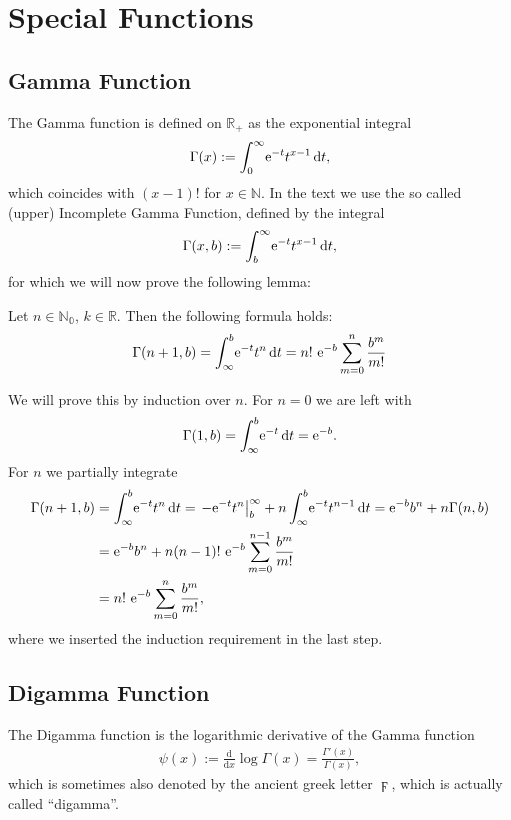 \section{Special Functions}
\subsection{Gamma Function}
The Gamma function is defined on $\mathbb{R}_{+}$ as the exponential integral
\begin{align}
    \Gamma(x) := \Integ[\infty]{0}{t}{\Eto{-t}t^{x-1}},
    \label{def:gamma}
\end{align}
which coincides with $(x-1)!$ for $x\in\mathbb{N}$. In the text we use the so
called (upper) Incomplete Gamma Function, defined by the integral
\begin{align}
  \Gamma(x,b) := \Integ[\infty]{b}{t}{\Eto{-t}t^{x-1}},
\end{align}
for which we will now prove the following lemma:
\begin{Lemma}
  Let $n\in\mathbb{N_0}$, $k\in\mathbb{R}$. Then the following formula holds:
  \begin{align}
    \Gamma(n+1, b) = \Integ[b]{\infty}{t}{\Eto{-t} t^n} = n!\ \Eto{-b}\sum_{m=0}^n
    \frac{b^m}{m!}
  \end{align}
  \begin{Proof}
    We will prove this by induction over $n$. For $n = 0$ we are left with
    \begin{align*}
      \Gamma(1, b) = \Integ[b]{\infty}{t}{\Eto{-t}} = \Eto{-b}.
    \end{align*}
    For $n$ we partially integrate
    \begin{align*}
      \Gamma(n+1, b) &= \Integ[b]{\infty}{t}{\Eto{-t} t^n} 
                     = \left.-\Eto{-t} t^n \right|_{b}^{\infty} +
      n\Integ[b]{\infty}{t}{\Eto{-t}t^{n-1}}
      = \Eto{-b} b^n + n\Gamma(n, b) \\
      &= \Eto{-b} b^n + n (n-1)!\ \Eto{-b}\sum_{m=0}^{n-1} \frac{b^m}{m!} \\
      &= n!\ \Eto{-b} \sum_{m=0}^n \frac{b^m}{m!},
    \end{align*}
    where we inserted the induction requirement in the last step.
  \end{Proof}
\end{Lemma}

\subsection{Digamma Function}
The Digamma function is the logarithmic derivative of the Gamma function
\begin{align}
    \psi(x) := \frac{\mathrm d}{\mathrm dx}\log{\Gamma(x)}
            = \frac{\Gamma'(x)}{\Gamma(x)},
    \label{def:digamma}
\end{align}
which is sometimes also denoted by the ancient greek letter $\digamma$, which is
actually called ``digamma''.


